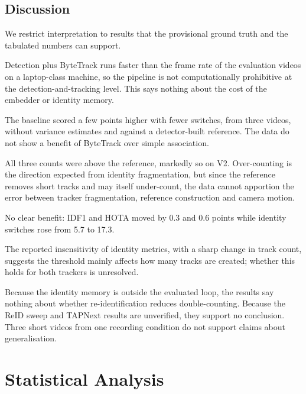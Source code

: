 \documentclass[11pt,a4paper]{article}
\begin{document}
\subsection{Discussion}
We restrict interpretation to results that the provisional ground truth and the tabulated numbers can support.
\begin{description}[leftmargin=1.2em,style=nextline]
\item[Pipeline feasibility.] Detection plus ByteTrack runs faster than the frame rate of the evaluation videos on a laptop-class machine, so the pipeline is not computationally prohibitive at the detection-and-tracking level. This says nothing about the cost of the embedder or identity memory.
\item[Baseline versus ByteTrack.] The baseline scored a few points higher with fewer switches, from three videos, without variance estimates and against a detector-built reference. The data do not show a benefit of ByteTrack over simple association.
\item[Counting.] All three counts were above the reference, markedly so on V2. Over-counting is the direction expected from identity fragmentation, but since the reference removes short tracks and may itself under-count, the data cannot apportion the error between tracker fragmentation, reference construction and camera motion.
\item[Camera-motion compensation.] No clear benefit: IDF1 and HOTA moved by 0.3 and 0.6 points while identity switches rose from 5.7 to 17.3.
\item[Detection threshold.] The reported insensitivity of identity metrics, with a sharp change in track count, suggests the threshold mainly affects how many tracks are created; whether this holds for both trackers is unresolved.
\item[What cannot be concluded.] Because the identity memory is outside the evaluated loop, the results say nothing about whether re-identification reduces double-counting. Because the ReID sweep and TAPNext results are unverified, they support no conclusion. Three short videos from one recording condition do not support claims about generalisation.
\end{description}

\section{Statistical Analysis}\label{sec:stats}
\end{document}
